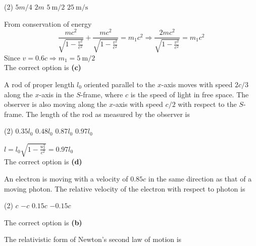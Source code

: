 \begin{enumerate}
\begin{minipage}{\textwidth}
\end{minipage}
\begin{tasks}(2)
	\task[\textbf{A.}] $5 m / 4$
	\task[\textbf{B.}]$2 m$
	\task[\textbf{C.}]$5 \mathrm{~m} / 2$
	\task[\textbf{D.}]$25 \mathrm{~m} / \mathrm{s}$
\end{tasks}
\begin{answer}
From conservation of energy\\
$$
\frac{m c^{2}}{\sqrt{1-\frac{v^{2}}{c^{2}}}}+\frac{m c^{2}}{\sqrt{1-\frac{v^{2}}{c^{2}}}}=m_{1} c^{2} \Rightarrow \frac{2 m c^{2}}{\sqrt{1-\frac{v^{2}}{c^{2}}}}=m_{1} c^{2}
$$
Since $v=0.6 c \Rightarrow m_{1}=5 \mathrm{~m} / 2$	\\
The correct option is \textbf{(c)}
\end{answer}
\begin{minipage}{\textwidth}
	\item A rod of proper length $l_{0}$ oriented parallel to the $x$-axis moves with speed $2 c / 3$ along the $x$-axis in the $S$-frame, where $c$ is the speed of light in free space. The observer is also moving along the $x$-axis with speed $c / 2$ with respect to the $S$-frame. The length of the rod as measured by the observer is
\end{minipage}
\begin{tasks}(2)
	\task[\textbf{A.}] $0.35 l_{0}$
	\task[\textbf{B.}]$0.48 l_{0}$
	\task[\textbf{C.}]$0.87 l_{0}$
	\task[\textbf{D.}]$0.97 l_{0}$
\end{tasks}
\begin{answer}
$l=l_{0} \sqrt{1-\frac{u_{x}^{2}}{c^{2}}}=0.97 l_{0}$\\
The correct option is \textbf{(d)}	
\end{answer}
\begin{minipage}{\textwidth}
	\item An electron is moving with a velocity of $0.85 c$ in the same direction as that of a moving photon. The relative velocity of the electron with respect to photon is
\end{minipage}
\begin{tasks}(2)
	\task[\textbf{A.}] $c$
	\task[\textbf{B.}]$-c$
	\task[\textbf{C.}] $0.15 c$
	\task[\textbf{D.}]$-0.15 c$
\end{tasks}
\begin{answer}
The correct option is \textbf{(b)}	
\end{answer}
\begin{minipage}{\textwidth}
	\item  The relativistic form of Newton's second law of motion is 

\end{minipage}
\end{enumerate}
